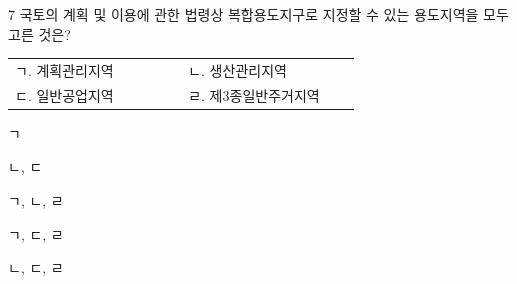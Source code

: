 \begin{question}{7}
국토의 계획 및 이용에 관한 법령상 복합용도지구로 지정할 수 있는 용도지역을 모두 고른 것은?
\begin{tcolorbox}[enhanced, colback=white, colframe=black, boxrule=0.4pt, arc=0pt, left=4pt, right=4pt, top=4pt, bottom=4pt]
\begin{tabular}{@{}p{0.42\linewidth}p{0.42\linewidth}@{}}
ㄱ. 계획관리지역 & ㄴ. 생산관리지역 \\
ㄷ. 일반공업지역 & ㄹ. 제3종일반주거지역
\end{tabular}
\end{tcolorbox}
\begin{choices}
  \item ㄱ
  \item ㄴ, ㄷ
  \item ㄱ, ㄴ, ㄹ
  \item ㄱ, ㄷ, ㄹ
  \item ㄴ, ㄷ, ㄹ
\end{choices}
\end{question}
